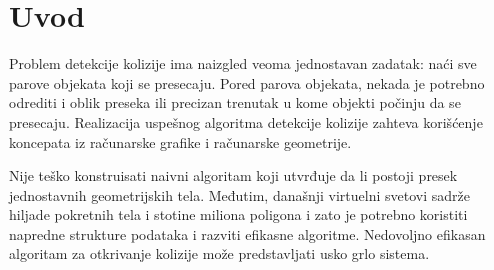 \documentclass[12pt,oneside]{memoir}
\begin{document}
\frontmatter

\naslovna
\komisija

\begingroup
\vspace*{-5\baselineskip}
\tableofcontents
\endgroup

\mainmatter

\chapter{Uvod}
\label{sec:uvod}

Problem detekcije kolizije ima naizgled veoma jednostavan zadatak: naći sve parove objekata
koji se presecaju. Pored parova objekata, nekada je potrebno odrediti i oblik preseka
ili precizan trenutak u kome objekti počinju da se presecaju. 
Realizacija uspešnog algoritma detekcije kolizije zahteva korišćenje 
koncepata iz računarske grafike i računarske geometrije.

Nije teško konstruisati naivni algoritam koji utvrđuje da li postoji presek jednostavnih geometrijskih tela.
Međutim, današnji virtuelni svetovi sadrže hiljade pokretnih tela i stotine miliona poligona i 
zato je potrebno koristiti napredne strukture podataka i razviti efikasne algoritme. 
Nedovoljno efikasan algoritam za otkrivanje kolizije može predstavljati usko grlo sistema.
\end{document}
